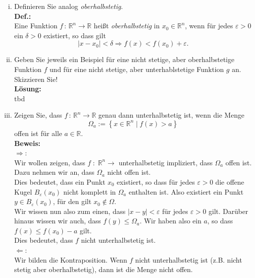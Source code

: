 \documentclass[11pt,a4paper,ngerman]{article}
\begin{document}
\begin{enumerate}[(i)]
	\item Definieren Sie analog \emph{oberhalbstetig}.\\
	\textbf{Def.:}\\
		Eine Funktion $f \, : \, \mathbb{R}^n \rightarrow \mathbb{R}$ heißt \emph{oberhalbstetig} in $x_0 \in \mathbb{R}^n$, wenn für jedes
		$\varepsilon > 0$ ein $\delta > 0$ existiert, so dass gilt
		$$
			| x - x_0 | < \delta \Rightarrow f(x) < f(x_0) + \varepsilon.
		$$

	\item Geben Sie jeweils ein Beispiel für eine nicht stetige, aber oberhalbstetige Funktion $f$ und für eine nicht stetige, aber unterhablstetige 
		Funktion $g$ an. Skizzieren Sie!\\
	\textbf{Lösung:}\\
		tbd

	\item Zeigen Sie, dass $f \, : \, \mathbb{R}^n \rightarrow \mathbb{R}$ genau dann unterhalbstetig ist, wenn die Menge
	$$
		\Omega_a := \left\{ x \in \mathbb{R}^n \; | \; f(x) > a \right\}
	$$
	offen ist für alle $a \in \mathbb{R}$.\\
	\textbf{Beweis:}\\
		$\Rightarrow$:\\
			Wir wollen zeigen, dass $f \; : \; \mathbb{R}^n \rightarrow$ unterhalbstetig impliziert, dass $\Omega_a$ offen ist.\\
			Dazu nehmen wir an, dass $\Omega_a$ nicht offen ist.\\

			Dies bedeutet, dass ein Punkt $x_0$ existiert, so dass für jedes $\varepsilon > 0$ die offene Kugel 
			$B_\varepsilon(x_0) $ nicht komplett in $\Omega_a$ enthalten ist. Also existiert ein Punkt $y \in B_\varepsilon(x_0)$, für
			den gilt $x_0 \not \in \Omega$.\\

			Wir wissen nun also zum einen, dass $|x - y | < \varepsilon$ für jedes $\varepsilon > 0$ gilt. Darüber hinaus wissen wir auch,
			dass $f(y) \leq \Omega_a$. Wir haben also ein $a$, so dass $f(x) \leq f(x_0) - a$ gilt.\\
			
			Dies bedeutet, dass $f$ nicht unterhalbstetig ist.\\

		$\Leftarrow$:\\
			Wir bilden die Kontraposition. Wenn $f$ nicht unterhalbstetig ist (z.B. nicht stetig aber oberhalbstetig), dann ist
			die Menge nicht offen.\\


\end{enumerate}
\end{document}
